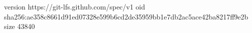 version https://git-lfs.github.com/spec/v1
oid sha256:ae358c8661d91ed07328e599b6cd2de35959bb1e7db2ac5ace42ba8217ff9e2b
size 43840
